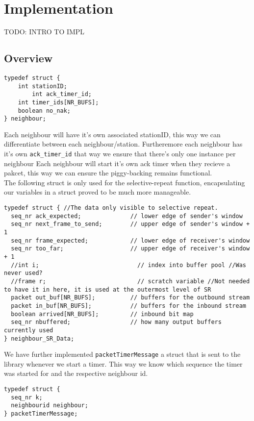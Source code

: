 \section{Implementation}
TODO: INTRO TO IMPL
\\
\subsection{Overview}

\begin{lstlisting}
typedef struct {
    int stationID;
		int ack_timer_id;
    int timer_ids[NR_BUFS];
    boolean no_nak;
} neighbour;
\end{lstlisting}

Each neighbour will have it's own associated stationID,
this way we can differentiate between each neighbour/station.
Furtheremore each neighbour has it's own \texttt{ack\_timer\_id} that way we ensure that there's only one instance per neighbour
Each neighbour will start it's own ack timer when they recieve a pakcet,
this way we can ensure the piggy-backing remains functional.
\\

The following struct is only used for the selective-repeat function,
encapsulating our variables in a struct proved to be much more manageable.

\begin{lstlisting}
typedef struct { //The data only visible to selective repeat.
  seq_nr ack_expected;              // lower edge of sender's window
  seq_nr next_frame_to_send;        // upper edge of sender's window + 1
  seq_nr frame_expected;            // lower edge of receiver's window
  seq_nr too_far;                   // upper edge of receiver's window + 1
  //int i;                            // index into buffer pool //Was never used?
  //frame r;                          // scratch variable //Not needed to have it in here, it is used at the outermost level of SR
  packet out_buf[NR_BUFS];          // buffers for the outbound stream
  packet in_buf[NR_BUFS];           // buffers for the inbound stream
  boolean arrived[NR_BUFS];         // inbound bit map
  seq_nr nbuffered;                 // how many output buffers currently used
} neighbour_SR_Data;
\end{lstlisting}


We have further implemented \texttt{packetTimerMessage} a struct that is sent to the library whenever we start a timer.
This way we know which sequence the timer was started for and the respective neighbour id.
\begin{lstlisting}
typedef struct {
  seq_nr k;
  neighbourid neighbour;
} packetTimerMessage;
\end{lstlisting}

